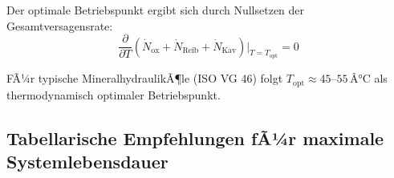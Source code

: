﻿\documentclass[a4paper,12pt]{scrreprt}
\theoremstyle{definition}
\begin{document}
Der optimale Betriebspunkt ergibt sich durch Nullsetzen der Gesamtversagensrate:
\begin{equation}
  \frac{\partial}{\partial T}\!\left(\dot{N}_{\mathrm{ox}} + \dot{N}_{\mathrm{Reib}}
    + \dot{N}_{\mathrm{Kav}}\right)\bigg|_{T = T_{\mathrm{opt}}} = 0
  \label{eq:opt_temp}
\end{equation}

FÃ¼r typische MineralhydraulikÃ¶le (ISO VG 46) folgt $T_{\mathrm{opt}} \approx 45$--$55\,Â°\mathrm{C}$
als thermodynamisch optimaler Betriebspunkt.

\subsection{Tabellarische Empfehlungen fÃ¼r maximale Systemlebensdauer}
\end{document}

